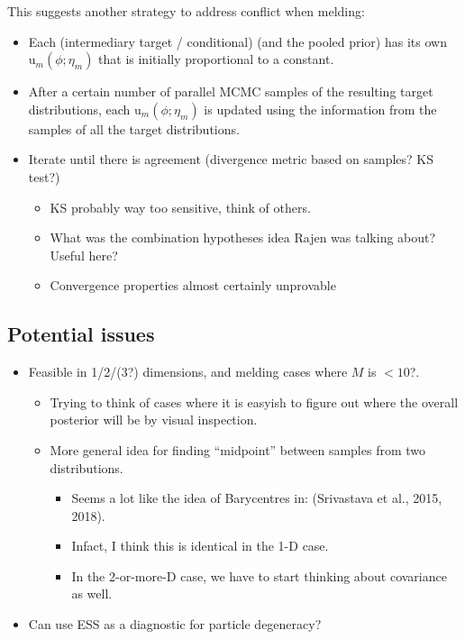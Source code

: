 \documentclass[10pt,a4paper,]{article}
\providecommand{\tightlist}{%
  \setlength{\itemsep}{0pt}\setlength{\parskip}{0pt}}
\newcommand{\tarw}{\text{u}}
\newcommand{\Nm}{M}
\newcommand{\modelindex}{m}
\begin{document}
This suggests another strategy to address conflict when melding:

\begin{itemize}
\tightlist
\item
  Each (intermediary target / conditional) (and the pooled prior) has
  its own \(\tarw_{\modelindex}(\phi; \eta_{\modelindex})\) that is
  initially proportional to a constant.
\item
  After a certain number of parallel MCMC samples of the resulting
  target distributions, each
  \(\tarw_{\modelindex}(\phi; \eta_{\modelindex})\) is updated using the
  information from the samples of all the target distributions.
\item
  Iterate until there is agreement (divergence metric based on samples?
  KS test?)

  \begin{itemize}
  \tightlist
  \item
    KS probably way too sensitive, think of others.
  \item
    What was the combination hypotheses idea Rajen was talking about?
    Useful here?
  \item
    Convergence properties almost certainly unprovable
  \end{itemize}
\end{itemize}

\subsection{Potential issues}\label{potential-issues}

\begin{itemize}
\tightlist
\item
  Feasible in 1/2/(3?) dimensions, and melding cases where \(\Nm\) is
  \(<10\)?.

  \begin{itemize}
  \tightlist
  \item
    Trying to think of cases where it is easyish to figure out where the
    overall posterior will be by visual inspection.
  \item
    More general idea for finding ``midpoint'' between samples from two
    distributions.

    \begin{itemize}
    \tightlist
    \item
      Seems a lot like the idea of Barycentres in: (Srivastava et al.,
      2015, 2018).
    \item
      Infact, I think this is identical in the 1-D case.
    \item
      In the 2-or-more-D case, we have to start thinking about
      covariance as well.
    \end{itemize}
  \end{itemize}
\item
  Can use ESS as a diagnostic for particle degeneracy?
\end{itemize}
\end{document}
